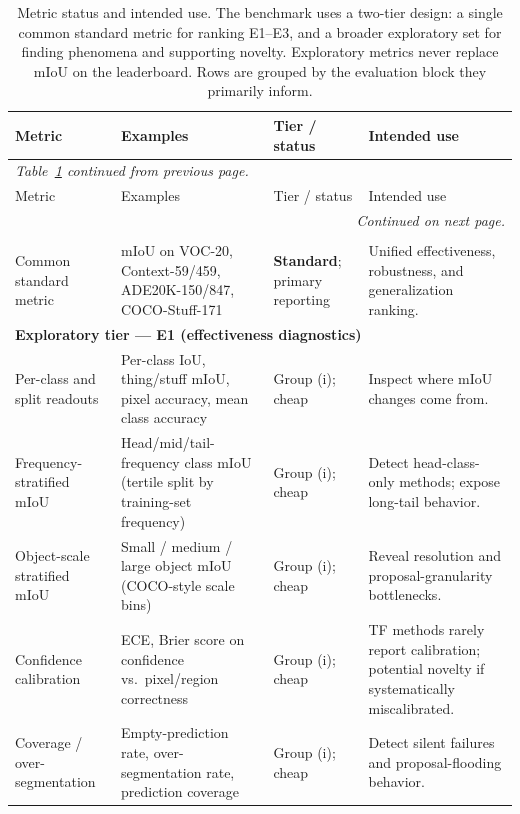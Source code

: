 \documentclass[11pt,a4paper]{article}
\begin{document}
{\scriptsize
\setlength{\tabcolsep}{3pt}
\begin{longtable}{p{} p{} p{} p{}}
\caption{Metric status and intended use. The benchmark uses a two-tier design: a single common standard metric for ranking E1--E3, and a broader exploratory set for finding phenomena and supporting novelty. Exploratory metrics never replace mIoU on the leaderboard. Rows are grouped by the evaluation block they primarily inform.}
\label{tab:metric-status}\\
\toprule
Metric & Examples & Tier / status & Intended use \\
\midrule
\endfirsthead
\multicolumn{4}{l}{\emph{Table~\ref{tab:metric-status} continued from previous page.}}\\
\toprule
Metric & Examples & Tier / status & Intended use \\
\midrule
\endhead
\midrule
\multicolumn{4}{r}{\emph{Continued on next page.}}\\
\endfoot
\bottomrule
\endlastfoot
\multicolumn{4}{l}{\textbf{Standard tier (used for E1/E2/E3 ranking)}} \\
Common standard metric & mIoU on VOC-20, Context-59/459, ADE20K-150/847, COCO-Stuff-171 & \textbf{Standard}; primary reporting & Unified effectiveness, robustness, and generalization ranking. \\
\midrule
\multicolumn{4}{l}{\textbf{Exploratory tier --- E1 (effectiveness diagnostics)}} \\
Per-class and split readouts & Per-class IoU, thing/stuff mIoU, pixel accuracy, mean class accuracy & Group (i); cheap & Inspect where mIoU changes come from. \\
Frequency-stratified mIoU & Head/mid/tail-frequency class mIoU (tertile split by training-set frequency) & Group (i); cheap & Detect head-class-only methods; expose long-tail behavior. \\
Object-scale stratified mIoU & Small / medium / large object mIoU (COCO-style scale bins) & Group (i); cheap & Reveal resolution and proposal-granularity bottlenecks. \\
Confidence calibration & ECE, Brier score on confidence vs.\ pixel/region correctness & Group (i); cheap & TF methods rarely report calibration; potential novelty if systematically miscalibrated. \\
Coverage / over-segmentation & Empty-prediction rate, over-segmentation rate, prediction coverage & Group (i); cheap & Detect silent failures and proposal-flooding behavior. \\

\end{longtable}}
\end{document}
